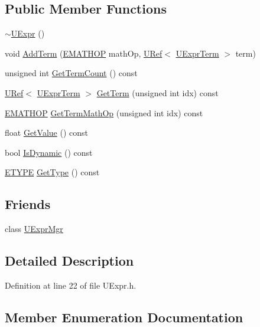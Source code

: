 \begin{CompactItemize}
\subsection*{Public Member Functions}
\begin{CompactItemize}
\item 
\hyperlink{class_u_expr_4888c3c61e89866633b80c4a90d98af5}{$\sim$UExpr} ()
\item 
void \hyperlink{class_u_expr_67deee67da12960d637e4bc650480dc2}{AddTerm} (\hyperlink{class_u_expr_8ca6700da0ea9a2a02d12dc70fd85e94}{EMATHOP} mathOp, \hyperlink{class_u_ref}{URef}$<$ \hyperlink{class_u_expr_term}{UExprTerm} $>$ term)
\item 
unsigned int \hyperlink{class_u_expr_54e08984d3e177691293726435d4cda2}{GetTermCount} () const 
\item 
\hyperlink{class_u_ref}{URef}$<$ \hyperlink{class_u_expr_term}{UExprTerm} $>$ \hyperlink{class_u_expr_9c7716e4671c5de3a98912442a2a3c3a}{GetTerm} (unsigned int idx) const 
\item 
\hyperlink{class_u_expr_8ca6700da0ea9a2a02d12dc70fd85e94}{EMATHOP} \hyperlink{class_u_expr_27a4662151061c4ae0dd5eee6cdc1aaf}{GetTermMathOp} (unsigned int idx) const 
\item 
float \hyperlink{class_u_expr_0f499790b77709e3e29d845570e4f523}{GetValue} () const 
\item 
bool \hyperlink{class_u_expr_3c36d1cce1d3c4d2f5870fc5ced16d09}{IsDynamic} () const 
\item 
\hyperlink{class_u_expr_term_20f132fb3c5e0228623e4268ba0d06c2}{ETYPE} \hyperlink{class_u_expr_ff255fe132b396d771c34978d6e048f9}{GetType} () const 
\end{CompactItemize}
\subsection*{Friends}
\begin{CompactItemize}
\item 
class \hyperlink{class_u_expr_aba1a84b84f2ff7cab4b76539215bd34}{UExprMgr}
\end{CompactItemize}


\subsection{Detailed Description}


Definition at line 22 of file UExpr.h.

\subsection{Member Enumeration Documentation}
\hypertarget{class_u_expr_8ca6700da0ea9a2a02d12dc70fd85e94}{
}
\end{CompactItemize}
